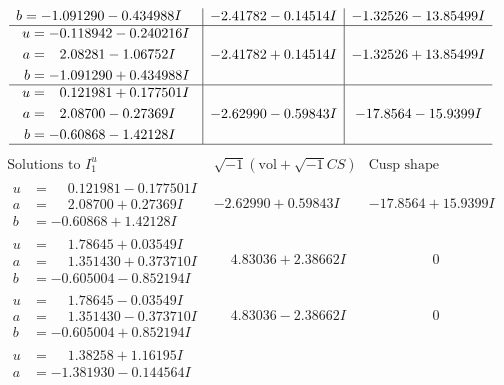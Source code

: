 \documentclass[1p]{elsarticle_modified}
\theoremstyle{definition}
\newcommand{\I}{\sqrt{-1}}
\begin{document}
$$\begin{array}{c|c|c}
\begin{aligned}
b &= -1.091290 - 0.434988 I\end{aligned}
 & -2.41782 - 0.14514 I & -1.32526 - 13.85499 I \\ \hline\begin{aligned}
u &= -0.118942 - 0.240216 I \\
a &= \phantom{-}2.08281 - 1.06752 I \\
b &= -1.091290 + 0.434988 I\end{aligned}
 & -2.41782 + 0.14514 I & -1.32526 + 13.85499 I \\ \hline\begin{aligned}
u &= \phantom{-}0.121981 + 0.177501 I \\
a &= \phantom{-}2.08700 - 0.27369 I \\
b &= -0.60868 - 1.42128 I\end{aligned}
 & -2.62990 - 0.59843 I & -17.8564 - 15.9399 I\\
 \hline 
 \end{array}$$\newpage$$\begin{array}{c|c|c}  
\text{Solutions to }I^u_{1}& \I (\text{vol} + \sqrt{-1}CS) & \text{Cusp shape}\\
 \hline 
\begin{aligned}
u &= \phantom{-}0.121981 - 0.177501 I \\
a &= \phantom{-}2.08700 + 0.27369 I \\
b &= -0.60868 + 1.42128 I\end{aligned}
 & -2.62990 + 0.59843 I & -17.8564 + 15.9399 I \\ \hline\begin{aligned}
u &= \phantom{-}1.78645 + 0.03549 I \\
a &= \phantom{-}1.351430 + 0.373710 I \\
b &= -0.605004 - 0.852194 I\end{aligned}
 & \phantom{-}4.83036 + 2.38662 I & \phantom{-0.000000 } 0 \\ \hline\begin{aligned}
u &= \phantom{-}1.78645 - 0.03549 I \\
a &= \phantom{-}1.351430 - 0.373710 I \\
b &= -0.605004 + 0.852194 I\end{aligned}
 & \phantom{-}4.83036 - 2.38662 I & \phantom{-0.000000 } 0 \\ \hline\begin{aligned}
u &= \phantom{-}1.38258 + 1.16195 I \\
a &= -1.381930 - 0.144564 I \\

\end{aligned}
\end{array}$$
\end{document}
